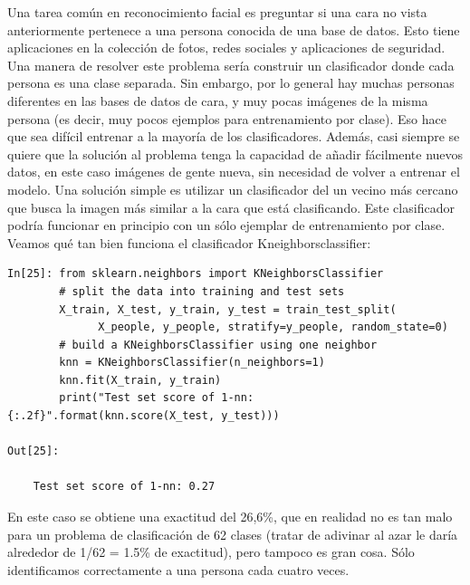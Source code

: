 Una tarea común en reconocimiento facial es preguntar si una cara no vista anteriormente pertenece a una persona conocida de una base de datos. Esto tiene aplicaciones en la colección de fotos, redes sociales y aplicaciones de seguridad. Una manera de resolver este problema sería construir un clasificador donde cada persona es una clase separada. Sin embargo, por lo general hay muchas personas diferentes en las bases de datos  de cara, y muy pocas imágenes de la misma persona (es decir, muy pocos ejemplos para entrenamiento por clase). Eso hace que sea difícil entrenar a la mayoría de los clasificadores. Además, casi siempre se quiere que la solución al problema tenga la capacidad de añadir fácilmente nuevos datos, en este caso imágenes de gente nueva, sin necesidad de volver a entrenar el modelo. Una solución simple es utilizar un clasificador del un vecino más cercano que busca la imagen más similar a la cara que está clasificando. Este clasificador podría funcionar en principio con un sólo ejemplar de entrenamiento por clase. \\

Veamos qué tan bien  funciona  el clasificador {\ttfamily Kneighborsclassifier}:\\

\begin{lstlisting} 
In[25]: from sklearn.neighbors import KNeighborsClassifier
        # split the data into training and test sets
        X_train, X_test, y_train, y_test = train_test_split(
              X_people, y_people, stratify=y_people, random_state=0)
        # build a KNeighborsClassifier using one neighbor
        knn = KNeighborsClassifier(n_neighbors=1)
        knn.fit(X_train, y_train)
        print("Test set score of 1-nn: {:.2f}".format(knn.score(X_test, y_test)))

Out[25]:

    Test set score of 1-nn: 0.27

\end{lstlisting} 


En este caso se obtiene  una exactitud del 26,6\%, que en realidad no es tan malo para un problema de  clasificación de 62 clases  (tratar de adivinar al azar le daría alrededor de 1/62 = 1.5\% de exactitud),  pero tampoco es gran cosa.   Sólo identificamos correctamente a una persona cada cuatro veces.
 
